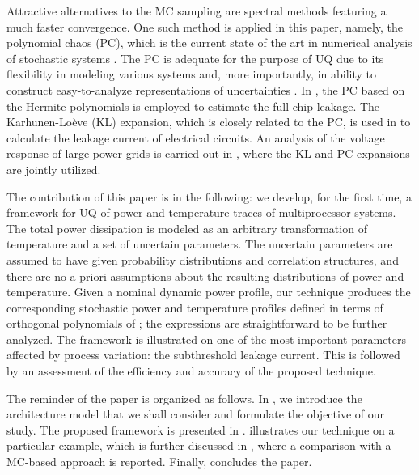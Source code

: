 Attractive alternatives to the MC sampling are spectral methods \cite{xiu2010, maitre2010, ghanem1991} featuring a much faster convergence. One such method is applied in this paper, namely, the polynomial chaos (PC), which is the current state of the art in numerical analysis of stochastic systems \cite{xiu2010}. The PC is adequate for the purpose of UQ due to its flexibility in modeling various systems and, more importantly, in ability to construct easy-to-analyze representations of uncertainties \cite{eldred2009}. In \cite{shen2009}, the PC based on the Hermite polynomials is employed to estimate the full-chip leakage. The Karhunen-Lo\`{e}ve (KL) expansion, which is closely related to the PC, is used in \cite{bhardwaj2006} to calculate the leakage current of electrical circuits. An analysis of the voltage response of large power grids is carried out in \cite{ghanta2006}, where the KL and PC expansions are jointly utilized.

The contribution of this paper is in the following: we develop, for the first time, a framework for UQ of power and temperature traces of multiprocessor systems. The total power dissipation is modeled as an arbitrary transformation of temperature and a set of uncertain parameters. The uncertain parameters are assumed to have given probability distributions and correlation structures, and there are no a priori assumptions about the resulting distributions of power and temperature. Given a nominal dynamic power profile, our technique produces the corresponding stochastic power and temperature profiles defined in terms of orthogonal polynomials of \rvs; the expressions are straightforward to be further analyzed. The framework is illustrated on one of the most important parameters affected by process variation: the subthreshold leakage current. This is followed by an assessment of the efficiency and accuracy of the proposed technique.

The reminder of the paper is organized as follows. In , we introduce the architecture model that we shall consider and formulate the objective of our study. The proposed framework is presented in .  illustrates our technique on a particular example, which is further discussed in , where a comparison with a MC-based approach is reported. Finally,  concludes the paper.
